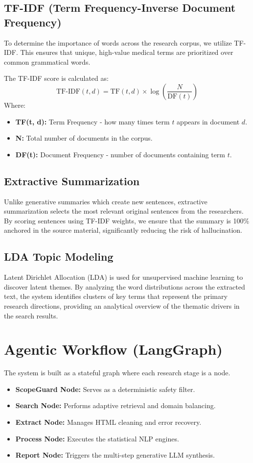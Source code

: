 \documentclass[12pt,a4paper]{article}
\begin{document}
\subsection{TF-IDF (Term Frequency-Inverse Document Frequency)}
To determine the importance of words across the research corpus, we utilize TF-IDF. This ensures that unique, high-value medical terms are prioritized over common grammatical words.

The TF-IDF score is calculated as:
\begin{equation}
\text{TF-IDF}(t, d) = \text{TF}(t, d) \times \log\left(\frac{N}{\text{DF}(t)}\right)
\end{equation}
Where:
\begin{itemize}
    \item \textbf{TF(t, d):} Term Frequency - how many times term $t$ appears in document $d$.
    \item \textbf{N:} Total number of documents in the corpus.
    \item \textbf{DF(t):} Document Frequency - number of documents containing term $t$.
\end{itemize}

\subsection{Extractive Summarization}
Unlike generative summaries which create new sentences, extractive summarization selects the most relevant original sentences from the researchers. By scoring sentences using TF-IDF weights, we ensure that the summary is 100\% anchored in the source material, significantly reducing the risk of hallucination.

\subsection{LDA Topic Modeling}
Latent Dirichlet Allocation (LDA) is used for unsupervised machine learning to discover latent themes. By analyzing the word distributions across the extracted text, the system identifies clusters of key terms that represent the primary research directions, providing an analytical overview of the thematic drivers in the search results.

\section{Agentic Workflow (LangGraph)}
The system is built as a stateful graph where each research stage is a node.
\begin{itemize}
    \item \textbf{ScopeGuard Node:} Serves as a deterministic safety filter.
    \item \textbf{Search Node:} Performs adaptive retrieval and domain balancing.
    \item \textbf{Extract Node:} Manages HTML cleaning and error recovery.
    \item \textbf{Process Node:} Executes the statistical NLP engines.
    \item \textbf{Report Node:} Triggers the multi-step generative LLM synthesis.
\end{itemize}
\end{document}
